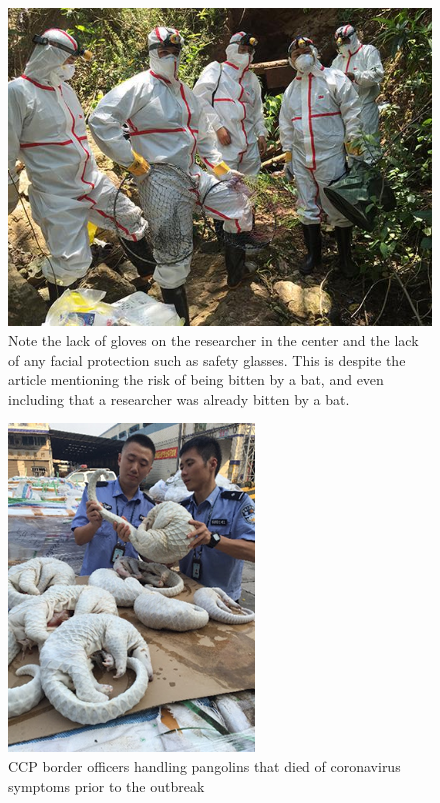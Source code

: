 \documentclass[11pt]{article}
\begin{document}
\begin{figure}[htbp]
\centering
\includegraphics[width=.9\linewidth]{./images/bat-no-ppe.png}
\caption{Note the lack of gloves on the researcher in the center and the lack of any facial protection such as safety glasses. This is despite the article mentioning the risk of being bitten by a bat, and even including that a researcher was already bitten by a bat.}
\end{figure}

\begin{figure}[htbp]
\centering
\includegraphics[width=.9\linewidth]{./images/pangolin-no-ppe.png}
\caption{CCP border officers handling pangolins that died of coronavirus symptoms prior to the outbreak}
\end{figure}
\end{document}
